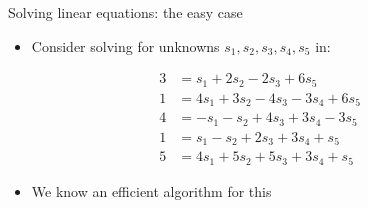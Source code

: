 \ifdefined\PRESENTATION\else\PassOptionsToClass{handout}{beamer}\fi\documentclass[aspectratio=169, lualatex]{beamer}
\begin{document}
\begin{frame}{Solving linear equations: the easy case}
	\begin{itemize}
		\item Consider solving for unknowns $s_1, s_2, s_3, s_4, s_5$ in:
	\end{itemize}
	\begin{align*}
		3 & = s_1 + 2s_2 - 2s_3 + 6s_5         \\
		1 & = 4s_1 + 3s_2 - 4s_3 - 3s_4 + 6s_5 \\
		4 & = -s_1 - s_2 + 4s_3 + 3s_4 - 3s_5  \\
		1 & = s_1 - s_2 + 2s_3 + 3s_4 + s_5    \\
		5 & = 4s_1 + 5s_2 + 5s_3 + 3s_4 + s_5
	\end{align*}
	\begin{itemize}
		\item We know an efficient algorithm for this
	\end{itemize}
\end{frame}
\end{document}
